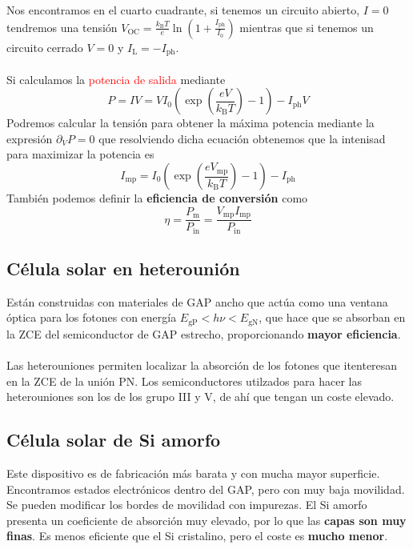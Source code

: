 Nos encontramos en el cuarto cuadrante, si tenemos un circuito abierto, $I=0$ tendremos una tensión $V_\mathrm{OC}=\frac{k_\mathrm{B}T}{e} \ln{\left(1+\frac{I_\mathrm{ph}}{I_\mathrm{0}} \right)}$ mientras que si tenemos un circuito cerrado $V=0$ y $I_\mathrm{L}=-I_\mathrm{ph}$.\\\\ Si calculamos la \textcolor{red}{potencia de salida} mediante
\begin{equation}
    P=IV=VI_0 \left( \exp{\left( \frac{eV}{k_\mathrm{B}T}\right)}-1\right )-I_\mathrm{ph}V
\end{equation}
Podremos calcular la tensión para obtener la máxima potencia mediante la expresión $\partial_V P=0$ que resolviendo dicha ecuación obtenemos que la intenisad para maximizar la potencia es
\begin{equation}
    I_\mathrm{mp}=I_0\left( \exp{\left( \frac{eV_\mathrm{mp}}{k_\mathrm{B}T}\right)}-1\right )-I_\mathrm{ph}
\end{equation}
También podemos definir la \textbf{eficiencia de conversión} como
\begin{equation}
    \eta=\frac{P_\mathrm{m}}{P_\mathrm{in}}=\frac{V_\mathrm{mp}I_\mathrm{mp}}{P_\mathrm{in}}
\end{equation}
\subsection{Célula solar en heterounión}
Están construidas con materiales de GAP ancho que actúa como una ventana óptica para los fotones con energía $E_\mathrm{gP}<h\nu<E_\mathrm{gN}$, que hace que se absorban en la ZCE del semiconductor de GAP estrecho, proporcionando \textbf{mayor eficiencia}.\\\\
Las heterouniones permiten localizar la absorción de los fotones que itenteresan en la ZCE de la unión PN. Los semiconductores utilzados para hacer las heterouniones son los de los grupo III y V, de ahí que tengan un coste elevado.
\subsection{Célula solar de Si amorfo}
Este dispositivo es de fabricación más barata y con mucha mayor superficie. Encontramos estados electrónicos dentro del GAP, pero con muy baja movilidad. Se pueden modificar los bordes de movilidad con impurezas. El Si amorfo presenta un coeficiente de absorción muy elevado, por lo que las \textbf{capas son muy finas}.
Es menos eficiente que el Si cristalino, pero el coste es \textbf{mucho menor}.
